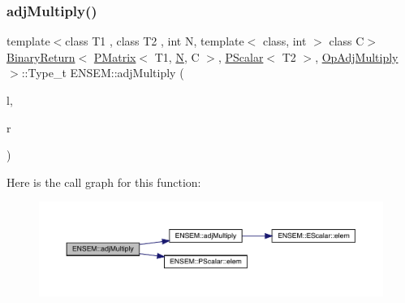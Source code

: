 \subsubsection{\texorpdfstring{adjMultiply()}{adjMultiply()}\hspace{0.1cm}{\footnotesize\ttfamily [1/3]}}
{\footnotesize\ttfamily template$<$class T1 , class T2 , int N, template$<$ class, int $>$ class C$>$ \\
\mbox{\hyperlink{structENSEM_1_1BinaryReturn}{Binary\+Return}}$<$ \mbox{\hyperlink{classENSEM_1_1PMatrix}{P\+Matrix}}$<$ T1, \mbox{\hyperlink{operator__name__util_8cc_a7722c8ecbb62d99aee7ce68b1752f337}{N}}, C $>$, \mbox{\hyperlink{classENSEM_1_1PScalar}{P\+Scalar}}$<$ T2 $>$, \mbox{\hyperlink{structENSEM_1_1OpAdjMultiply}{Op\+Adj\+Multiply}} $>$\+::Type\+\_\+t E\+N\+S\+E\+M\+::adj\+Multiply (\begin{DoxyParamCaption}\item[{const \mbox{\hyperlink{classENSEM_1_1PMatrix}{P\+Matrix}}$<$ T1, \mbox{\hyperlink{operator__name__util_8cc_a7722c8ecbb62d99aee7ce68b1752f337}{N}}, C $>$ \&}]{l,  }\item[{const \mbox{\hyperlink{classENSEM_1_1PScalar}{P\+Scalar}}$<$ T2 $>$ \&}]{r }\end{DoxyParamCaption})\hspace{0.3cm}{\ttfamily [inline]}}

Here is the call graph for this function\+:\nopagebreak
\begin{figure}[H]
\begin{center}
\leavevmode
\includegraphics[width=350pt]{df/d0a/group__primmatrix_ga47a69844104af73a48b189fb08811b87_cgraph}
\end{center}
\end{figure}
\mbox{\label{group__primmatrix_ga01de3db0f09195f592339c9241bd4692}} 

